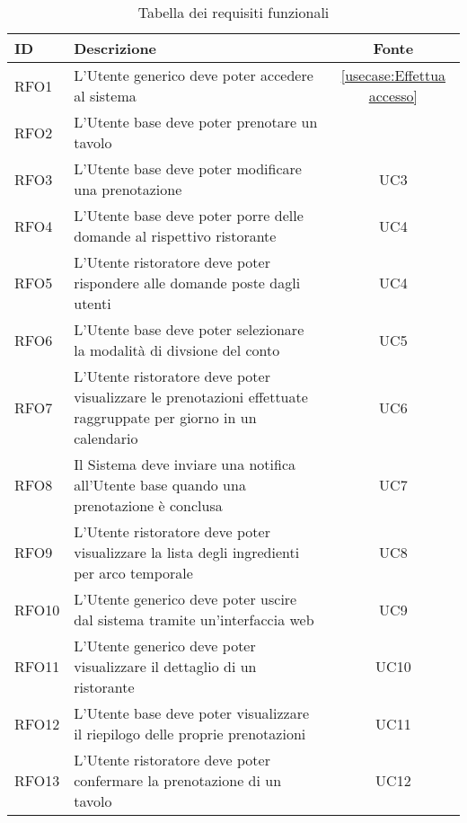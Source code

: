\begin{table}[H]
	\renewcommand{\arraystretch}{1.5}
	\centering
	\begin{tabularx}{\textwidth}{l|X|c}
		\textbf{ID} & \textbf{Descrizione}                                                                                                      & \textbf{Fonte} \\
		\hline
		RFO1        & L'Utente generico deve poter accedere al sistema                                                                           & \autoref{usecase:Effettua accesso}            \\
		\hline
		RFO2        & L'Utente base deve poter prenotare un tavolo                                                                              &             \\
		\hline
		RFO3        & L'Utente base deve poter modificare una prenotazione                                                                      & UC3            \\
		\hline
		RFO4        & L'Utente base deve poter porre delle domande al rispettivo ristorante                                                     & UC4            \\
		\hline
		RFO5        & L'Utente ristoratore deve poter rispondere alle domande poste dagli utenti                                                & UC4            \\
		\hline
		RFO6        & L'Utente base deve poter selezionare la modalità di divsione del conto                                                    & UC5            \\
		\hline
		RFO7        & L'Utente ristoratore deve poter visualizzare le prenotazioni effettuate raggruppate per giorno in un calendario           & UC6            \\
		\hline
		RFO8        & Il Sistema deve inviare una notifica all'Utente base quando una prenotazione è conclusa                                   & UC7            \\
		\hline
		RFO9        & L'Utente ristoratore deve poter visualizzare la lista degli ingredienti per arco temporale                                & UC8            \\
		\hline
		RFO10       & L'Utente generico deve poter uscire dal sistema tramite un'interfaccia web                                                 & UC9            \\
		\hline
		RFO11       & L'Utente generico deve poter visualizzare il dettaglio di un ristorante                                                    & UC10           \\
		\hline
		RFO12       & L'Utente base deve poter visualizzare il riepilogo delle proprie prenotazioni                                             & UC11           \\
		\hline
		RFO13       & L'Utente ristoratore deve poter confermare la prenotazione di un tavolo                                                   & UC12           \\
\end{tabularx}
\caption{Tabella dei requisiti funzionali}
\end{table}

